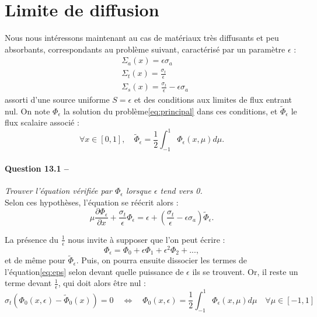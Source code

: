 \documentclass[11pt,a4paper]{article}
\newcommand{\question}[2]{\paragraph{Question #1 --}\hspace{-7pt}\textit{#2} \\}
\newcommand{\Phit}{\widetilde{\Phi}}
\begin{document}
 \section{Limite de diffusion}
 
 Nous nous intéressons maintenant au cas de matériaux très diffusants et peu absorbants, correspondants au problème suivant, caractérisé par un paramètre $\epsilon$ :
 \begin{equation}
  \begin{align}
   &\Sigma_a(x) = \epsilon \sigma_a\\
   &\Sigma_t(x) = \frac{\sigma_t}{\epsilon}\\
   &\Sigma_s(x) = \frac{\sigma_t}{\epsilon} - \epsilon \sigma_a
  \end{align}
 \end{equation}
 assorti d'une source uniforme $S = \epsilon$ et des conditions aux limites de flux entrant nul.
 On note $\Phi_\epsilon$ la solution du problème\ref{eq:principal} dans ces conditions, et $\Phit_\epsilon$ le flux scalaire associé :
 \begin{equation}
  \forall x\in [0,1], \quad \Phit_\epsilon = \frac{1}{2} \int_{-1}^1 \Phi_\epsilon(x,\mu) d\mu .
 \end{equation}
 
\question{13.1}{Trouver l'équation vérifiée par $\Phi_\epsilon$ lorsque $\epsilon$ tend vers 0.}

Selon ces hypothèses, l'équation se réécrit alors :
\begin{equation}
 \mu \frac{\partial \Phi_\epsilon}{\partial x} + \frac{\sigma_t}{\epsilon} \Phi_\epsilon =  \epsilon + \left(\frac{\sigma_t}{\epsilon} - \epsilon \sigma_a\right) \Phit_\epsilon .
 \label{eq:eps}
\end{equation}

La présence du $\frac{1}{\epsilon}$ nous invite à supposer que l'on peut écrire :
\begin{equation}
 \Phi_\epsilon = \Phi_0 + \epsilon\Phi_1 + \epsilon^2 \Phi_2 + ... ,
\end{equation}
et de même pour $\Phit_\epsilon$.
Puis, on pourra ensuite dissocier les termes de l'équation\ref{eq:eps} selon devant quelle puissance de $\epsilon$ ils se trouvent.
Or, il reste un terme devant $\frac{1}{\epsilon}$, qui doit alors être nul :
\begin{equation}
 \sigma_t (\Phi_0(x,\epsilon) - \Phit_0(x)) = 0 \quad \Leftrightarrow \quad \Phi_0(x,\epsilon) = \frac{1}{2} \int_{-1}^1 \Phi_\epsilon(x,\mu) d\mu \quad \forall \mu \in [-1,1]
\end{equation}
\end{document}
